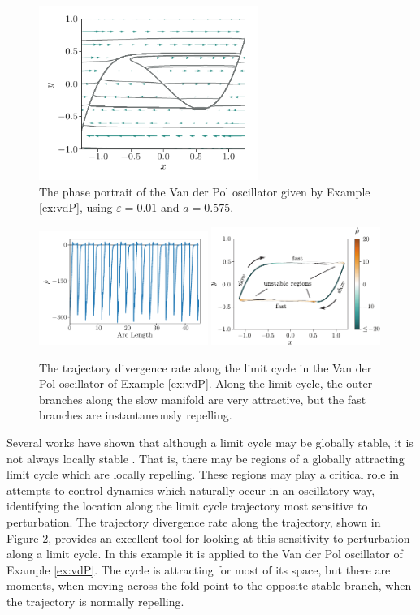 \documentclass[twocolumn]{svjour3}
\begin{document}
\begin{figure}
\centering
\includegraphics[width=2.8in]{Fig15}
\caption{The phase portrait of the Van der Pol oscillator given by Example \ref{ex:vdP}, using $\varepsilon = 0.01$ and $a = 0.575$.}
\label{fig:phaseplot-vdP}
\end{figure}

\begin{figure}
\centering
\includegraphics[width=0.49\textwidth]{Fig16}
\includegraphics[width=0.49\textwidth]{Fig17}
\caption{The trajectory divergence rate along the limit cycle in the Van der Pol oscillator of Example \ref{ex:vdP}. Along the limit cycle, the outer branches along the slow manifold are very attractive, but the fast branches are instantaneously repelling.}
\label{fig:limitcycle}
\end{figure}

Several works have shown that although a limit cycle may be globally stable, it is not always locally stable \cite{ali1999local,norris2008revisiting}. That is, there may be regions of a globally attracting limit cycle which are locally repelling. These regions may play a critical role in attempts to control dynamics which naturally occur in an oscillatory way, identifying the location along the limit cycle trajectory most sensitive to perturbation. The trajectory divergence rate along the trajectory, shown in Figure \ref{fig:limitcycle}, provides an excellent tool for looking at this sensitivity to perturbation along a limit cycle. In this example it is applied to the Van der Pol oscillator of Example \ref{ex:vdP}. The cycle is attracting for most of its space, but there are moments, when moving across the fold point to the opposite stable branch, when the trajectory is normally repelling.
\end{document}
